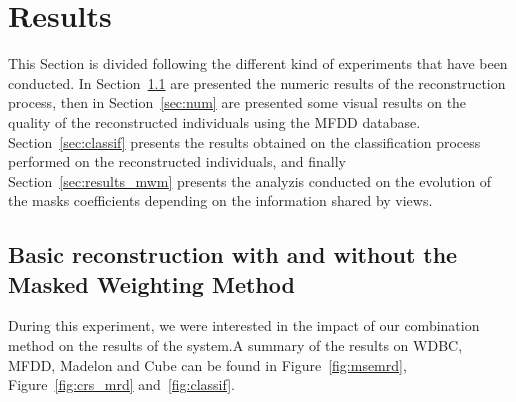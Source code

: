 	\section{Results}
\label{sec:results}
This Section is divided following the different kind of experiments that have been conducted. In Section~\ref{sec:msemrd} are presented the numeric results of the reconstruction process, then in Section~\ref{sec:num} are presented some visual results on the quality of the reconstructed individuals using the MFDD database. Section~\ref{sec:classif} presents the results obtained on the classification process performed on the reconstructed individuals, and finally Section~\ref{sec:results_mwm} presents the analyzis conducted on the evolution of the masks coefficients depending on the information shared by views.

    \subsection{Basic reconstruction with and without the Masked Weighting Method}
\label{sec:msemrd}
	
During this experiment, we were interested in the impact of our combination method on the results of the system.\@ A summary of the results on WDBC, MFDD, Madelon and Cube can be found in Figure~\ref{fig:msemrd}, Figure~\ref{fig:crs_mrd} and~\ref{fig:classif}.

